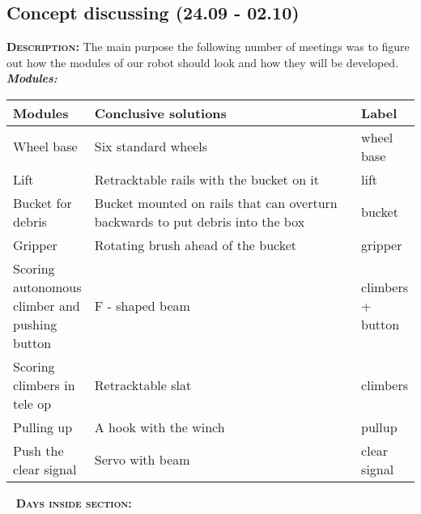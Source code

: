 \subsection{Concept discussing (24.09 - 02.10)}
	\textsc{\textbf{Description:}} The main purpose the following number of meetings was to figure out how the modules of our robot should look and how they will be developed.\newline \newline
	\textit{\textbf{Modules:}}
	
	\begin{table}[H]
		\vspace{-2mm}
		\begin{center}
			\begin{tabular}{|p{0.2\linewidth}|p{0.7\linewidth}|p{0.1\linewidth}|}
				\hline
				Modules & Conclusive solutions & Label \\
				\hline
				Wheel base & Six standard wheels & wheel base \\
				\hline
				Lift & Retracktable rails with the bucket on it & lift \\
				\hline
				Bucket for debris & Bucket mounted on rails that can overturn backwards to put debris into the box & bucket \\
				\hline
				Gripper & Rotating brush ahead of the bucket & gripper\\
				\hline
				Scoring autonomous climber and pushing button & F - shaped beam & climbers + button\\
				\hline
				Scoring climbers in tele op & Retracktable slat & climbers\\
				\hline
				Pulling up & A hook with the winch & pullup\\
				\hline
				Push the clear signal & Servo with beam & clear signal\\
				\hline
			\end{tabular}
		\end{center}
	\end{table}
  
   \newline
  \textsc{\textbf{Days inside section:}}
  
  
  
  